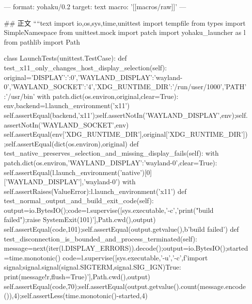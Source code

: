 ---
format: yohaku/0.2
target: text
macro: '[[macros/raw]]'
---

## 正文
````text
import io,os,sys,time,unittest
import tempfile
from types import SimpleNamespace
from unittest.mock import patch
import yohaku_launcher as l
from pathlib import Path

class LaunchTests(unittest.TestCase):
    def test_x11_only_changes_host_display_selection(self):
        original={'DISPLAY':':0','WAYLAND_DISPLAY':'wayland-0','WAYLAND_SOCKET':'4','XDG_RUNTIME_DIR':'/run/user/1000','PATH':'/usr/bin'}
        with patch.dict(os.environ,original,clear=True):
            env,backend=l.launch_environment('x11')
            self.assertEqual(backend,'x11');self.assertNotIn('WAYLAND_DISPLAY',env);self.assertNotIn('WAYLAND_SOCKET',env)
            self.assertEqual(env['XDG_RUNTIME_DIR'],original['XDG_RUNTIME_DIR']);self.assertEqual(dict(os.environ),original)
    def test_native_preserves_selection_and_missing_display_fails(self):
        with patch.dict(os.environ,{'WAYLAND_DISPLAY':'wayland-0'},clear=True):
            self.assertEqual(l.launch_environment('native')[0]['WAYLAND_DISPLAY'],'wayland-0')
            with self.assertRaises(ValueError):l.launch_environment('x11')
    def test_normal_output_and_build_exit_code(self):
        output=io.BytesIO();code=l.supervise([sys.executable,'-c','print("build failed");raise SystemExit(101)'],Path.cwd(),output)
        self.assertEqual(code,101);self.assertEqual(output.getvalue(),b'build failed\n')
    def test_disconnection_is_bounded_and_process_terminated(self):
        message=next(iter(l.DISPLAY_ERRORS)).decode();output=io.BytesIO();started=time.monotonic()
        code=l.supervise([sys.executable,'-u','-c',f'import signal;signal.signal(signal.SIGTERM,signal.SIG_IGN)\nwhile True: print({message!r},flush=True)'],Path.cwd(),output)
        self.assertEqual(code,70);self.assertEqual(output.getvalue().count(message.encode()),4);self.assertLess(time.monotonic()-started,4)

